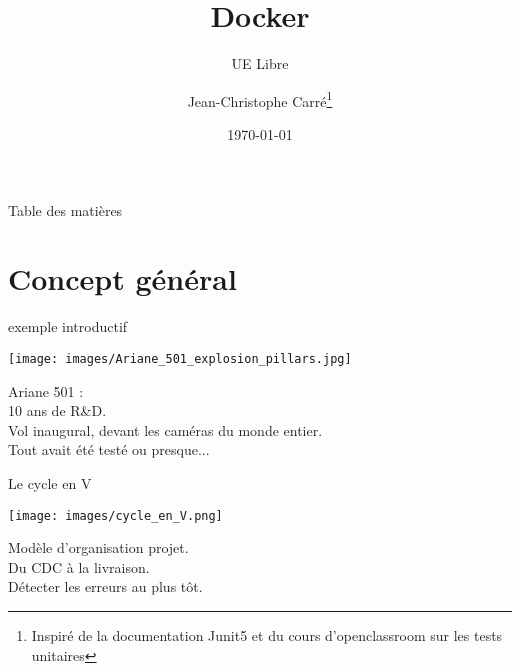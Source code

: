 \documentclass[a4paper]{beamer}
\title{Docker}
\subtitle[DAP]{UE Libre}
\institute{IFNTI L3}
\author{Jean-Christophe Carré\thanks{Inspiré de la documentation Junit5 et du cours d'openclassroom sur les tests unitaires}}
\date{\today}
\begin{document}
{
\begin{frame}[plain]
	\titlepage
\end{frame}
}

\begin{frame}{Table des matières}
	\tableofcontents
\end{frame}

{

\section{Concept général}

\begin{frame}{exemple introductif}
	\begin{minipage}{0.4\textwidth}
		\texttt{[image: images/Ariane\_501\_explosion\_pillars.jpg]}
	\end{minipage}\hfill
	\begin{minipage}{0.55\textwidth}
		Ariane 501 :\\
		
		10 ans de R\&D.\\
		
		Vol inaugural, devant les caméras du monde entier.\\
		
		Tout avait été testé \tiny ou presque...
	\end{minipage}
\end{frame}

\begin{frame}{Le cycle en V}
	\noindent
	\begin{minipage}{0.45\textwidth}
		\noindent
		\texttt{[image: images/cycle\_en\_V.png]}
	\end{minipage}\hfill
	\begin{minipage}{0.5\textwidth}
		Modèle d'organisation projet.\\
		Du CDC à la livraison.\\
		Détecter les erreurs au plus tôt.
	\end{minipage}
	

\end{frame}}
\end{document}

